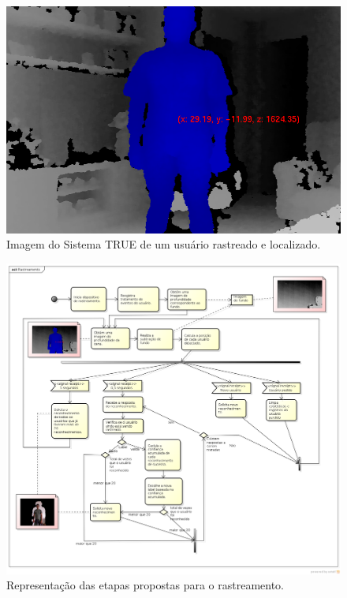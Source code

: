 	\begin{figure}[H]
		\begin{center}
			\includegraphics[scale=0.45]{figuras/4.ProblemaEProposta/localizacao.png}
		\end{center}
		\caption{Imagem do Sistema TRUE de um usuário rastreado e localizado.}
		\label{fig:localizacao}
	\end{figure}
	
	
	\begin{figure}[H]
		\begin{center}
			\includegraphics[scale=0.40]{figuras/4.ProblemaEProposta/diagrama-rastreamento.png}
		\end{center}
		\caption{Representação das etapas propostas para o rastreamento.}
		\label{fig:processo-rastreamento}
	\end{figure}
